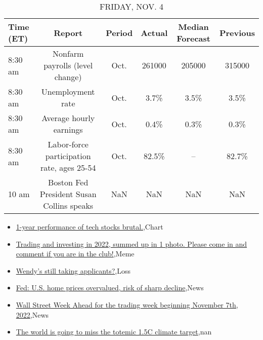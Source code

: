 \documentclass{article}%
\begin{document}
%


\begin{table}[htbp]%
\caption{FRIDAY, NOV. 4}%
\centering%
\begin{adjustbox}{width=1\textwidth}%
\begin{tabular}{lccccc}
\toprule
Time (ET) &                                     Report & Period & Actual & Median Forecast & Previous \\
\midrule
  8:30 am &            Nonfarm payrolls (level change) &   Oct. & 261000 &          205000 &   315000 \\
  8:30 am &                          Unemployment rate &   Oct. &   3.7\% &            3.5\% &     3.5\% \\
  8:30 am &                    Average hourly earnings &   Oct. &   0.4\% &            0.3\% &     0.3\% \\
  8:30 am & Labor-force participation rate, ages 25-54 &   Oct. &  82.5\% &              -- &    82.7\% \\
    10 am &  Boston Fed President Susan Collins speaks &    NaN &    NaN &             NaN &      NaN \\
\bottomrule
\end{tabular}
%
\end{adjustbox}%
\end{table}

%
\begin{itemize}%
\item%
\href{https://reddit.com/r/wallstreetbets/comments/ymrlzl/1year\_performance\_of\_tech\_stocks\_brutal/}{1-year performance of tech stocks brutal.},Chart%
\item%
\href{https://reddit.com/r/wallstreetbets/comments/ymr19j/trading\_and\_investing\_in\_2022\_summed\_up\_in\_1/}{Trading and investing in 2022, summed up in 1 photo. Please come in and comment if you are in the club!},Meme%
\item%
\href{https://reddit.com/r/wallstreetbets/comments/ymphno/wendys\_still\_taking\_applicants/}{Wendy's still taking applicants?},Loss%
\item%
\href{https://reddit.com/r/StockMarket/comments/ymjvfl/fed\_us\_home\_prices\_overvalued\_risk\_of\_sharp/}{Fed: U.S. home prices overvalued, risk of sharp decline},News%
\item%
\href{https://reddit.com/r/StockMarket/comments/ymd9ey/wall\_street\_week\_ahead\_for\_the\_trading\_week/}{Wall Street Week Ahead for the trading week beginning November 7th, 2022},News%
\item%
\href{https://reddit.com/r/Economics/comments/ymi5mz/the\_world\_is\_going\_to\_miss\_the\_totemic\_15c/}{The world is going to miss the totemic 1.5C climate target},nan%
\end{itemize}%
\end{document}
